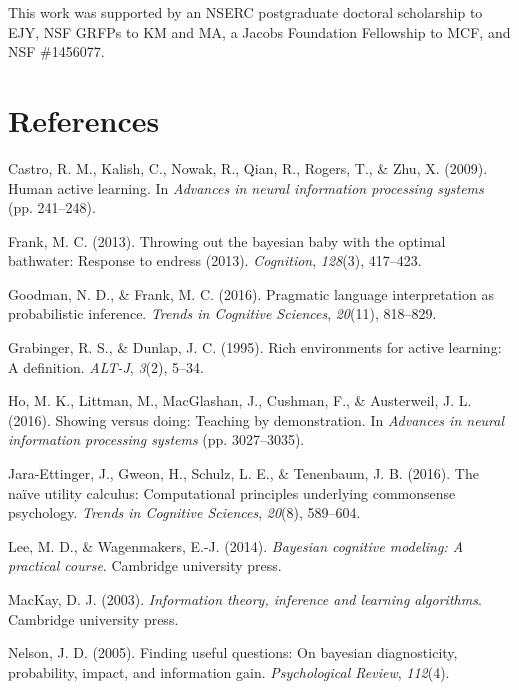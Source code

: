 \documentclass[10pt, letterpaper]{article}
\begin{document}
This work was supported by an NSERC postgraduate doctoral scholarship to
EJY, NSF GRFPs to KM and MA, a Jacobs Foundation Fellowship to MCF, and
NSF \#1456077.

\section{References}\label{references}

\setlength{\parindent}{-0.1in} \setlength{\leftskip}{0.125in}

\noindent

\hypertarget{refs}{}
\hypertarget{ref-castro2009human}{}
Castro, R. M., Kalish, C., Nowak, R., Qian, R., Rogers, T., \& Zhu, X.
(2009). Human active learning. In \emph{Advances in neural information
processing systems} (pp. 241--248).

\hypertarget{ref-frank2013throwing}{}
Frank, M. C. (2013). Throwing out the bayesian baby with the optimal
bathwater: Response to endress (2013). \emph{Cognition}, \emph{128}(3),
417--423.

\hypertarget{ref-goodman2016}{}
Goodman, N. D., \& Frank, M. C. (2016). Pragmatic language
interpretation as probabilistic inference. \emph{Trends in Cognitive
Sciences}, \emph{20}(11), 818--829.

\hypertarget{ref-grabinger1995rich}{}
Grabinger, R. S., \& Dunlap, J. C. (1995). Rich environments for active
learning: A definition. \emph{ALT-J}, \emph{3}(2), 5--34.

\hypertarget{ref-ho2016showing}{}
Ho, M. K., Littman, M., MacGlashan, J., Cushman, F., \& Austerweil, J.
L. (2016). Showing versus doing: Teaching by demonstration. In
\emph{Advances in neural information processing systems} (pp.
3027--3035).

\hypertarget{ref-jara2016}{}
Jara-Ettinger, J., Gweon, H., Schulz, L. E., \& Tenenbaum, J. B. (2016).
The naïve utility calculus: Computational principles underlying
commonsense psychology. \emph{Trends in Cognitive Sciences},
\emph{20}(8), 589--604.

\hypertarget{ref-lee2014bayesian}{}
Lee, M. D., \& Wagenmakers, E.-J. (2014). \emph{Bayesian cognitive
modeling: A practical course}. Cambridge university press.

\hypertarget{ref-mackay2003}{}
MacKay, D. J. (2003). \emph{Information theory, inference and learning
algorithms}. Cambridge university press.

\hypertarget{ref-nelson2005}{}
Nelson, J. D. (2005). Finding useful questions: On bayesian
diagnosticity, probability, impact, and information gain.
\emph{Psychological Review}, \emph{112}(4).
\end{document}
